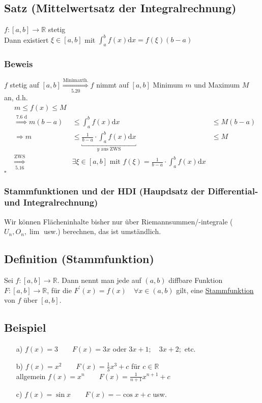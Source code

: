 \documentclass[12pt, titlepage]{article}
\newcommand{\R}{\mathds{R}}
\renewcommand{\>}{\rightarrow}
\renewcommand{\*}{\cdot}
\begin{document}
	\subsection{Satz (Mittelwertsatz der Integralrechnung)}
	$f\colon[a,b]\>\R$ stetig\\
	Dann existiert $\xi\in[a,b]$ mit $\int_{a}^{b}f(x)\textrm{d}x=f(\xi)(b-a)$\\
	\subsubsection*{Beweis}
	$f$ stetig auf $[a,b]\overset{\textrm{Minimaxth.}}{\underset{\textrm{5.20}}{\Rightarrow}}f$ nimmt auf $[a,b]$ Minimum $m$ und Maximum $M$ an, d.h.\\
	\begin{align*}
		&m\leq f(x)\leq M&&\\
		&\overset{\textrm{7.6 d}}{\Rightarrow}m(b-a)&\leq\int_{a}^{b}f(x)\textrm{d}x&\leq M(b-a)\\
		&\Rightarrow m&\leq\underbracket{\frac{1}{b-a}\*\int_{a}^{b}f(x)\textrm{d}x}_{y\textrm{ aus ZWS}}&\leq M\\
		&\overset{\textrm{ZWS}}{\underset{\textrm{5.16}}{\Rightarrow}}&\exists\xi\in[a,b]\textrm{ mit }f(\xi)=\frac{1}{b-a}\*\int_{a}^{b}f(x)\textrm{d}x&
	\end{align*}
	\hfill$\square$
	\subsubsection*{Stammfunktionen und der HDI (Haupdsatz der Differential- und Integralrechnung)}
	Wir können Flächeninhalte bisher nur über Riemannsummen/-integrale ($U_n,O_n,\lim$ usw.) berechnen, das ist umständlich.
	\subsection{Definition (Stammfunktion)}
	Sei $f\colon[a,b]\>\R$. Dann nennt man jede auf $(a,b)$ diffbare Funktion $F\colon[a,b]\>\R$, für die $F^\prime(x)=f(x)\quad\forall x\in(a,b)$ gilt, eine \underline{Stammfunktion} von $f$ über $[a,b]$.
	\subsection{Beispiel}
	\begin{itemize}
		\item[a)] $f(x)=3\qquad F(x)=3x$ oder $3x+1;\quad3x+2;$ etc.
		\item[b)] $f(x)=x^2\qquad F(x)=\frac{1}{3}x^3+c$ für $c\in\R$\\
		allgemein $f(x)=x^n\qquad F(x)=\frac{1}{n+1}x^{n+1}+c$
		\item[c)] $f(x)=\sin x\qquad F(x)=-\cos x+c$ usw.
	\end{itemize}
	
	
	
	
	
	
	
	
	
	
	
	
	
	
\end{document}
